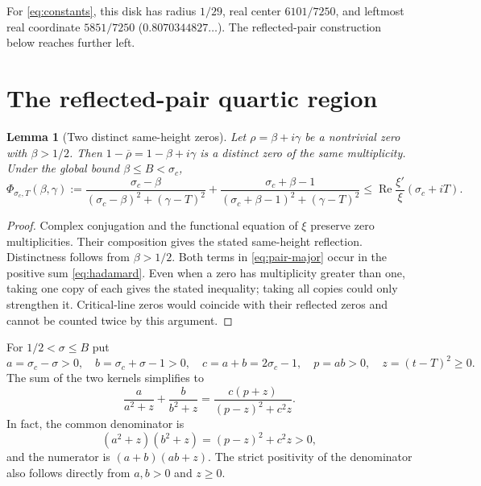 \documentclass[11pt,a4paper]{article}
\newtheorem{lemma}[theorem]{Lemma}
\theoremstyle{definition}
\newcommand{\Rea}{\operatorname{Re}}
\begin{document}
For \eqref{eq:constants}, this disk has radius $1/29$, real center
$6101/7250$, and leftmost real coordinate $5851/7250$
($0.8070344827\ldots$). The reflected-pair construction below reaches
further left.

\section{The reflected-pair quartic region}
\label{sec:quartic}

\begin{lemma}[Two distinct same-height zeros]\label{lem:pair}
Let $\rho=\beta+i\gamma$ be a nontrivial zero with $\beta>1/2$.
Then $1-\overline\rho=1-\beta+i\gamma$ is a distinct zero of the
same multiplicity. Under the global bound $\beta\le B<\sigma_c$,
\begin{equation}\label{eq:pair-major}
 \Phi_{\sigma_c,T}(\beta,\gamma)
 :=\frac{\sigma_c-\beta}{(\sigma_c-\beta)^2+(\gamma-T)^2}
 +\frac{\sigma_c+\beta-1}{(\sigma_c+\beta-1)^2+(\gamma-T)^2}
 \le\Rea\frac{\xi'}{\xi}(\sigma_c+iT).
\end{equation}
\end{lemma}

\begin{proof}
Complex conjugation and the functional equation of $\xi$ preserve zero
multiplicities. Their composition gives the stated same-height
reflection. Distinctness follows from $\beta>1/2$. Both terms in
\eqref{eq:pair-major} occur in the positive sum
\eqref{eq:hadamard}. Even when a zero has multiplicity greater than
one, taking one copy of each gives the stated inequality; taking all
copies could only strengthen it. Critical-line zeros would coincide
with their reflected zeros and cannot be counted twice by this argument.
\end{proof}

For $1/2<\sigma\le B$ put
\begin{equation}\label{eq:abpz}
 a=\sigma_c-\sigma>0,\quad b=\sigma_c+\sigma-1>0,\quad
 c=a+b=2\sigma_c-1,\quad p=ab>0,\quad z=(t-T)^2\ge0.
\end{equation}
The sum of the two kernels simplifies to
\begin{equation}\label{eq:pair-identity}
 \frac a{a^2+z}+\frac b{b^2+z}
 =\frac{c(p+z)}{(p-z)^2+c^2z}.
\end{equation}
In fact, the common denominator is
\[
 (a^2+z)(b^2+z)=(p-z)^2+c^2z>0,
\]
and the numerator is $(a+b)(ab+z)$. The strict positivity of
the denominator also follows directly from $a,b>0$ and $z\ge0$.
\end{document}
